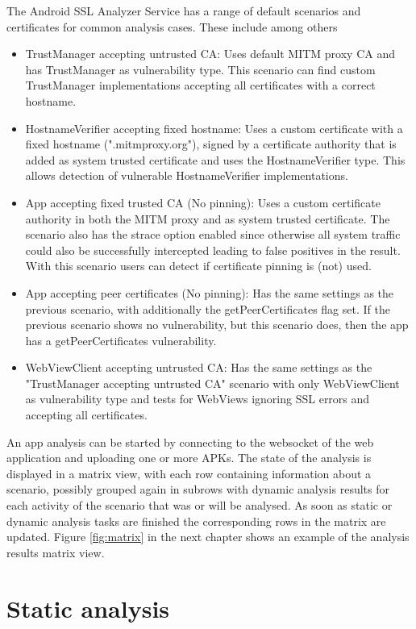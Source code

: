 \documentclass[draft,final]{vutinfth} %
\begin{document}
The Android SSL Analyzer Service has a range of default scenarios and certificates for common analysis cases. These include among others
\begin{itemize}
\item TrustManager accepting untrusted CA: Uses default MITM proxy CA and has TrustManager as vulnerability type. This scenario can find custom TrustManager implementations accepting all certificates with a correct hostname.
\item HostnameVerifier accepting fixed hostname: Uses a custom certificate with a fixed hostname (".mitmproxy.org"), signed by a certificate authority that is added as system trusted certificate and uses the HostnameVerifier type. This allows detection of vulnerable HostnameVerifier implementations.
\item App accepting fixed trusted CA (No pinning): Uses a custom certificate authority in both the MITM proxy and as system trusted certificate. The scenario also has the strace option enabled since otherwise all system traffic could also be successfully intercepted leading to false positives in the result.  With this scenario users can detect if certificate pinning is (not) used.
\item App accepting peer certificates (No pinning): Has the same settings as the previous scenario, with additionally the getPeerCertificates flag set. If the previous scenario shows no vulnerability, but this scenario does, then the app has a getPeerCertificates vulnerability.
\item WebViewClient accepting untrusted CA: Has the same settings as the "TrustManager accepting untrusted CA" scenario with only WebViewClient as vulnerability type and tests for WebViews ignoring SSL errors and accepting all certificates.
\end{itemize}

An app analysis can be started by connecting to the websocket of the web application and uploading one or more APKs. The state of the analysis is displayed in a matrix view, with each row containing information about a scenario, possibly grouped again in subrows with dynamic analysis results for each activity of the scenario that was or will be analysed. As soon as static or dynamic analysis tasks are finished the corresponding rows in the matrix are updated. Figure \ref{fig:matrix} in the next chapter shows an example of the analysis results matrix view.

\section*{Static analysis}
\end{document}
